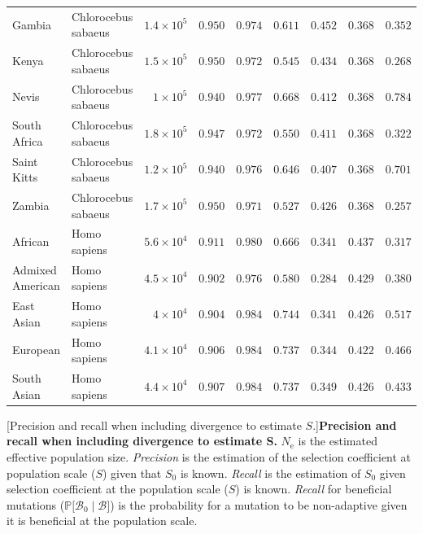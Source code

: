 \documentclass{article}
\newcommand{\Ne}{N_{\text{e}}}
\newcommand{\proba}{\mathbb{P}}
\newcommand{\Sphy}{S_{0}}
\newcommand{\SphyBen}{\mathcal{B}_0}
\newcommand{\given}{\mid}
\newcommand{\Spop}{S}
\newcommand{\SpopBen}{\mathcal{B}}
\begin{document}
\begin{center}
\begin{adjustbox}{width=\textwidth}
\begin{tabular}{||l|l|r||r|r||r|r||r|r||}
                \rowcolor{LIGHTGREY} Gambia & Chlorocebus sabaeus & $1.4\times 10^{5}$ & $ 0.950$ & $ 0.974$ & $ 0.611$ & $ 0.452$ & $ 0.368$ & $ 0.352$ \\
                \rowcolor{LIGHTGREY} Kenya & Chlorocebus sabaeus & $1.5\times 10^{5}$ & $ 0.950$ & $ 0.972$ & $ 0.545$ & $ 0.434$ & $ 0.368$ & $ 0.268$ \\
                \rowcolor{LIGHTGREY} Nevis & Chlorocebus sabaeus & $ 1\times 10^{5}$ & $ 0.940$ & $ 0.977$ & $ 0.668$ & $ 0.412$ & $ 0.368$ & $ 0.784$ \\
                \rowcolor{LIGHTGREY} South Africa & Chlorocebus sabaeus & $1.8\times 10^{5}$ & $ 0.947$ & $ 0.972$ & $ 0.550$ & $ 0.411$ & $ 0.368$ & $ 0.322$ \\
                \rowcolor{LIGHTGREY} Saint Kitts & Chlorocebus sabaeus & $1.2\times 10^{5}$ & $ 0.940$ & $ 0.976$ & $ 0.646$ & $ 0.407$ & $ 0.368$ & $ 0.701$ \\
                \rowcolor{LIGHTGREY} Zambia & Chlorocebus sabaeus & $1.7\times 10^{5}$ & $ 0.950$ & $ 0.971$ & $ 0.527$ & $ 0.426$ & $ 0.368$ & $ 0.257$ \\
                African & Homo sapiens & $5.6\times 10^{4}$ & $ 0.911$ & $ 0.980$ & $ 0.666$ & $ 0.341$ & $ 0.437$ & $ 0.317$ \\
                Admixed American & Homo sapiens & $4.5\times 10^{4}$ & $ 0.902$ & $ 0.976$ & $ 0.580$ & $ 0.284$ & $ 0.429$ & $ 0.380$ \\
                East Asian & Homo sapiens & $ 4\times 10^{4}$ & $ 0.904$ & $ 0.984$ & $ 0.744$ & $ 0.341$ & $ 0.426$ & $ 0.517$ \\
                European & Homo sapiens & $4.1\times 10^{4}$ & $ 0.906$ & $ 0.984$ & $ 0.737$ & $ 0.344$ & $ 0.422$ & $ 0.466$ \\
                South Asian & Homo sapiens & $4.4\times 10^{4}$ & $ 0.907$ & $ 0.984$ & $ 0.737$ & $ 0.349$ & $ 0.426$ & $ 0.433$ \\
                \bottomrule
            \end{tabular}
        \end{adjustbox}
        [Precision and recall when including divergence to estimate $\Spop$.]{\textbf{Precision and recall when including divergence to estimate $\bm{\Spop}$.}
        $\Ne$ is the estimated effective population size.
        \textit{Precision} is the estimation of the selection coefficient at population scale ($\Spop$) given that $\Sphy$ is known.
        \textit{Recall} is the estimation of $\Sphy$ given selection coefficient at the population scale ($\Spop$) is known.
        \textit{Recall} for beneficial mutations ($\proba{[}\SphyBen \given \SpopBen{]}$) is the probability for a mutation to be non-adaptive given it is beneficial at the population scale.
        \label{table:inc-div}}
    \end{center}
\end{document}
